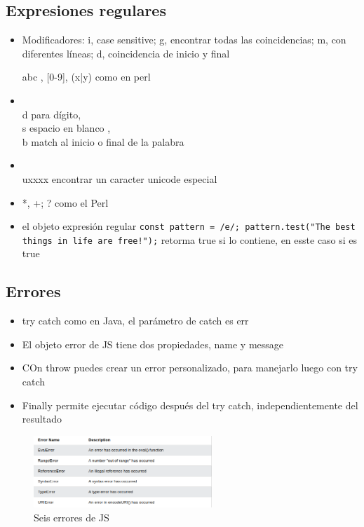\documentclass{article}
\begin{document}
 \subsection{Expresiones regulares}

 \begin{itemize}
   \item Modificadores: i, case sensitive; g, encontrar todas las coincidencias; m, con diferentes líneas; d, coincidencia de inicio y final
   \item [abc], [0-9], (x|y) como en perl
   \item \\d para dígito, \\s espacio en blanco , \\b match al inicio o final de la palabra
   \item \\uxxxx encontrar un caracter unicode especial
   \item *, +; ? como el Perl
   \item el objeto expresión regular \lstinline{const pattern = /e/; pattern.test("The best things in life are free!");} retorma true si lo contiene, en esste caso si es true
 \end{itemize}

 \subsection{Errores}
 \begin{itemize}
   \item try catch como en Java, el parámetro de catch es err
   \item El objeto error de  JS tiene dos propiedades, name y message
   \item COn throw puedes crear un error personalizado, para manejarlo luego con try catch
   \item Finally permite ejecutar código después del try catch, independientemente del resultado
 \end{itemize}

 \begin{figure}[H]
   \centering
   \includegraphics[width=0.6\textwidth]{table10.png}
   \caption{Seis errores de JS}
 \end{figure}
\end{document}
